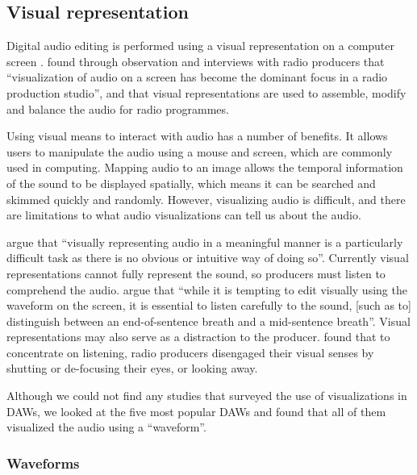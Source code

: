 \subsection{Visual representation}\label{sec:background-daw-visual}

Digital audio editing is performed using a visual representation on a computer screen \citep{Derry2002,Hausman2012}.
\citet{Barbour2004} found through observation and interviews with radio producers that ``visualization of audio on a
screen has become the dominant focus in a radio production studio'', and that visual representations are used to
assemble, modify and balance the audio for radio programmes.

Using visual means to interact with audio has a number of benefits. It allows users to manipulate the audio using a
mouse and screen, which are commonly used in computing.  Mapping audio to an image allows the temporal information of
the sound to be displayed spatially, which means it can be searched and skimmed quickly and randomly.  However,
visualizing audio is difficult, and there are limitations to what audio visualizations can tell us about the audio.

\citet{Bouamrane2007} argue that ``visually representing audio in a meaningful manner is a particularly difficult
task as there is no obvious or intuitive way of doing so''.  Currently visual representations cannot fully represent
the sound, so producers must listen to comprehend the audio.  \citet[p. 45]{McLeish2015} argue that ``while it is
tempting to edit visually using the waveform on the screen, it is essential to listen carefully to the sound, [such as
to] distinguish between an end-of-sentence breath and a mid-sentence breath''.  Visual representations may also serve
as a distraction to the producer.  \citet{Barbour2004} found that to concentrate on listening, radio producers
disengaged their visual senses by shutting or de-focusing their eyes, or looking away.

Although we could not find any studies that surveyed the use of visualizations in DAWs, we looked at the five most
popular DAWs \citep{AskAudio2015} and found that all of them visualized the audio using a ``waveform''.








\subsubsection{Waveforms}\label{sec:background-waveforms}


